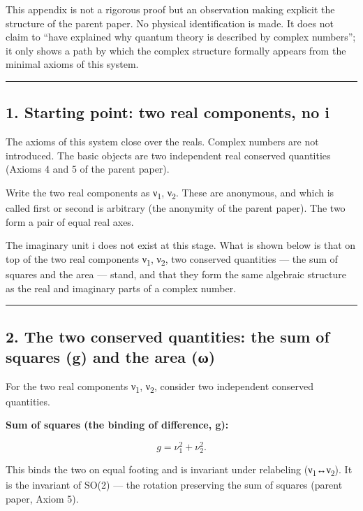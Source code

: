 \documentclass[11pt]{ltjsarticle}
\begin{document}
This appendix is not a rigorous proof but an observation making explicit
the structure of the parent paper. No physical identification is made.
It does not claim to ``have explained why quantum theory is described by
complex numbers''; it only shows a path by which the complex structure
formally appears from the minimal axioms of this system.

\begin{center}\rule{0.5\linewidth}{0.5pt}\end{center}

\subsection{1. Starting point: two real components, no
i}\label{starting-point-two-real-components-no-i}

The axioms of this system close over the reals. Complex numbers are not
introduced. The basic objects are two independent real conserved
quantities (Axioms 4 and 5 of the parent paper).

Write the two real components as ν\textsubscript{1}, ν\textsubscript{2}. These are anonymous, and which
is called first or second is arbitrary (the anonymity of the parent
paper). The two form a pair of equal real axes.

The imaginary unit i does not exist at this stage. What is shown below
is that on top of the two real components ν\textsubscript{1}, ν\textsubscript{2}, two conserved
quantities --- the sum of squares and the area --- stand, and that they
form the same algebraic structure as the real and imaginary parts of a
complex number.

\begin{center}\rule{0.5\linewidth}{0.5pt}\end{center}

\subsection{2. The two conserved quantities: the sum of squares (g) and
the area
(ω)}\label{the-two-conserved-quantities-the-sum-of-squares-g-and-the-area-ux3c9}

For the two real components ν\textsubscript{1}, ν\textsubscript{2}, consider two independent conserved
quantities.

\textbf{Sum of squares (the binding of difference, g):}

\[g = \nu_1^2 + \nu_2^2.\]

This binds the two on equal footing and is invariant under relabeling
(ν\textsubscript{1}↔ν\textsubscript{2}). It is the invariant of SO(2) --- the rotation preserving the
sum of squares (parent paper, Axiom 5).
\end{document}
